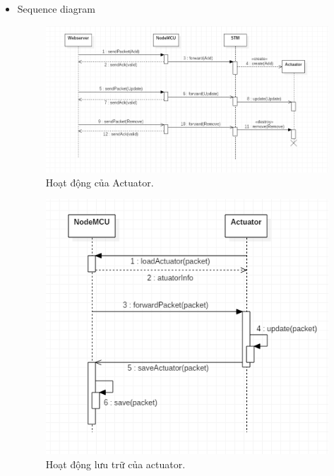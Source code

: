 \documentclass[a4paper,12pt,oneside]{article}
\begin{document}
\begin{itemize}

\item Sequence diagram

\begin{figure}[H]
	\centering
	\includegraphics[scale=.7]{hinh/actuatorSequence.PNG}
	\caption{Hoạt động của Actuator.}
\end{figure}

\begin{figure}[H]
	\centering
	\includegraphics[scale=.8]{hinh/saveactuator.PNG}
	\caption{Hoạt động lưu trữ của actuator.}
\end{figure}


\end{itemize}
\end{document}
